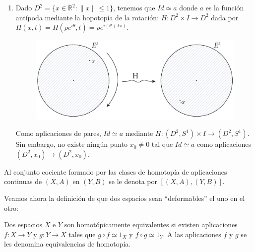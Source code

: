 \begin{ejems}
\begin{enumerate}
\item \label{ej2:3} Dado $D^2 = \{ x \in \mathbb{R}^2 : \| x \| \leq 1 \}$, tenemos que $Id \simeq a$ donde $a$ es la función antípoda mediante la hopotopía de la rotación: $H : D^2 \times I \longrightarrow D^2$ dada por $H(x, t) = H(\rho e^{i\theta}, t) = \rho e^{i(\theta + t\pi)}$. \par
\begin{figure}[h]
\centering
\includegraphics[width=0.65\linewidth]{images/homotrotacalt.pdf}
\end{figure}
Como aplicaciones de pares, $Id \simeq a$ mediante $H : (D^2, S^1) \times I \longrightarrow (D^2, S^1)$. Sin embargo, no existe ningún punto $x_0 \neq 0$ tal que $Id \simeq a$ como aplicaciones $(D^2, x_0) \longrightarrow (D^2, x_0)$.
\end{enumerate}
\end{ejems}
Al conjunto cociente formado por las clases de homotopía de aplicaciones continuas de $(X, A)$ en $(Y, B)$ se le denota por $[(X, A), (Y, B)]$. \par

Veamos ahora la definición de que dos espacios sean ``deformables'' el uno en el otro:

\begin{defin}
Dos espacios $X$ e $Y$ son homotópicamente equivalentes si existen aplicaciones $f: X \longrightarrow Y$ y $g: Y \longrightarrow X$ tales que $g \circ f \simeq 1_X$ y $f \circ g \simeq 1_Y$. A las aplicaciones $f$ y $g$ se les denomina equivalencias de homotopía.
\end{defin}

